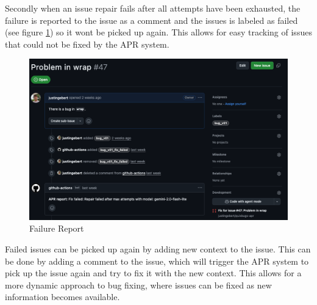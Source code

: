 Secondly when an issue repair fails after all attempts have been exhausted, the failure is reported to the issue as a comment and the issues is labeled as failed (see figure \ref{fig:failure-report}) so it wont be picked up again. This allows for easy tracking of issues that could not be fixed by the APR system.

\begin{figure}[H]
    \centering
    \includegraphics[width=1\textwidth]{images/workflow/failure_comment.png}
    \caption{Failure Report}
    \label{fig:failure-report}
\end{figure}

Failed issues can be picked up again by adding new context to the issue. This can be done by adding a comment to the issue, which will trigger the APR system to pick up the issue again and try to fix it with the new context. This allows for a more dynamic approach to bug fixing, where issues can be fixed as new information becomes available.


